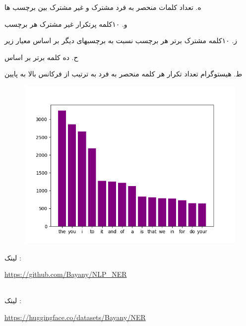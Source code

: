 ه. تعداد کلمات منحصر به فرد مشترک و غیر مشترک بین برچسب ها
\begin{latin}
\begin{center}
  \fontsize{8pt}{9pt}\ttfamily
\end{center}
\end{latin}

\newpage

و.  ۱۰کلمه پرتکرار غیر مشترک هر برچسب
\begin{latin}
\begin{center}
    \fontsize{4pt}{7pt}\ttfamily
\end{center}
\end{latin}

ز.  ۱۰کلمه مشترک برتر هر برچسب نسبت به برچسبهای دیگر بر اساس معیار زیر
\begin{latin}
\begin{center}
  \fontsize{4pt}{7pt}\ttfamily
\end{center}
\end{latin}


ح. ده کلمه برتر بر اساس 
\begin{latin}
\begin{center}
  \fontsize{4pt}{7pt}\ttfamily
\end{center}
\end{latin}


\newpage

ط. هیستوگرام تعداد تکرار هر کلمه منحصر به فرد به ترتیب از فرکانس بالا به پایین
\begin{figure}[H]
    \centering
    \includegraphics[width=0.7\linewidth]{../stats/hist.png}
   \end{figure}
   
لینک  :
\\
 \begin{latin}
 \url{https://github.com/Bayany/NLP_NER}
 \end{latin}
 

\\
لینک :
\\
 \begin{latin}
 \url{https://huggingface.co/datasets/Bayany/NER}
 \end{latin}
 
